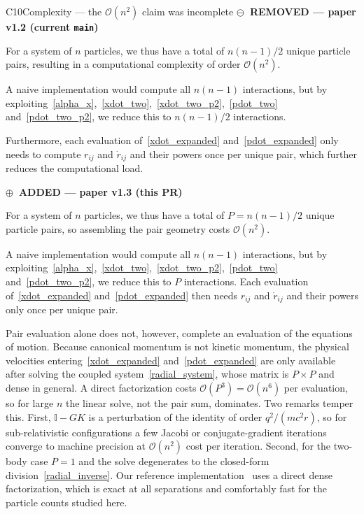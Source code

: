 \documentclass[12pt,a4paper]{article}
\theoremstyle{definition}
\theoremstyle{remark}
\newcommand{\oldtag}{{\sffamily\bfseries\footnotesize
  \textcolor{oldink}{$\ominus$~REMOVED \textnormal{\textmd{— paper v1.2 (current \texttt{main})}}}}\par\smallskip}
\newcommand{\newtag}{{\sffamily\bfseries\footnotesize
  \textcolor{newink}{$\oplus$~ADDED \textnormal{\textmd{— paper v1.3 (this PR)}}}}\par\smallskip}
\newcommand{\eqnote}[1]{\par\smallskip{\footnotesize\sffamily\textcolor{barink}{#1}}\par}
\begin{document}
\begin{diffbox}{C10}{Complexity --- the $\mathcal{O}(n^2)$ claim was incomplete}
\oldtag
For a system of $n$ particles, we thus have a total of $n(n-1)/2$ unique particle pairs, resulting in a computational complexity of order $\mathcal{O}(n^2)$.

A naive implementation would compute all $n(n-1)$ interactions, but by exploiting~\eqref{alpha_x},~\eqref{xdot_two},~\eqref{xdot_two_p2},~\eqref{pdot_two} and~\eqref{pdot_two_p2}, we reduce this to $n(n-1)/2$ interactions.

Furthermore, each evaluation of~\eqref{xdot_expanded} and~\eqref{pdot_expanded} only needs to compute $r_{ij}$ and $\dot{r}_{ij}$ and their powers once per unique pair, which further reduces the computational load.

\eqnote{This asserted that per-pair work completes an evaluation. It does not:
with $\vec p \ne m\vec v$ the velocities are not known until a coupled system is
solved.}
\tcblower
\newtag
For a system of $n$ particles, we thus have a total of $P = n(n-1)/2$ unique particle pairs, so assembling the pair geometry costs $\mathcal{O}(n^2)$.

A naive implementation would compute all $n(n-1)$ interactions, but by exploiting~\eqref{alpha_x},~\eqref{xdot_two},~\eqref{xdot_two_p2},~\eqref{pdot_two} and~\eqref{pdot_two_p2}, we reduce this to $P$ interactions. Each evaluation of~\eqref{xdot_expanded} and~\eqref{pdot_expanded} then needs $r_{ij}$ and $\dot{r}_{ij}$ and their powers only once per unique pair.

Pair evaluation alone does not, however, complete an evaluation of the equations of motion. Because canonical momentum is not kinetic momentum, the physical velocities entering~\eqref{xdot_expanded} and~\eqref{pdot_expanded} are only available after solving the coupled system~\eqref{radial_system}, whose matrix is $P \times P$ and dense in general. A direct factorization costs $\mathcal{O}(P^3) = \mathcal{O}(n^6)$ per evaluation, so for large $n$ the linear solve, not the pair sum, dominates. Two remarks temper this. First, $\mathbb{I} - GK$ is a perturbation of the identity of order $q^2/(m c^2 r)$, so for sub-relativistic configurations a few Jacobi or conjugate-gradient iterations converge to machine precision at $\mathcal{O}(n^2)$ cost per iteration. Second, for the two-body case $P = 1$ and the solve degenerates to the closed-form division~\eqref{radial_inverse}. Our reference implementation~\citep{WeberElectrodynamics.jl} uses a direct dense factorization, which is exact at all separations and comfortably fast for the particle counts studied here.
\end{diffbox}
\end{document}
